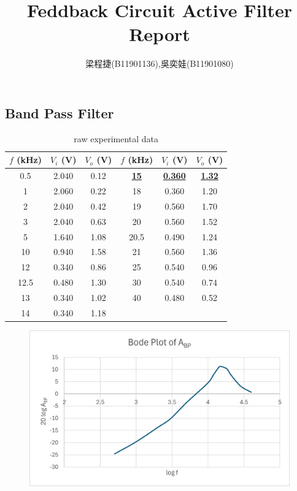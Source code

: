 \documentclass{article}
\title{Feddback Circuit Active Filter Report}
\author{梁程捷(B11901136),吳奕娃(B11901080)}
\date{}
\begin{document}
\begin{CJK*}{UTF8}{bkai}
\maketitle

\section*{Band Pass Filter}
\begin{minipage}{0.5\textwidth}
\begin{table}[H]
\begin{tabular}{|c|c|c||c|c|c|}
    \hline
    $f$ (\unit{\kilo\hertz}) &  $V_i$ (V)& $V_o$ (V) & $f$ (\unit{\kilo\hertz}) &  $V_i$ (V)& $V_o$ (V)\\
    \hline\hline
    0.5	    & 2.040 & 0.12 & \textbf{\underline{{15}}} & \textbf{\underline{{0.360}}} & \textbf{\underline{{1.32}}}   \\
    1       & 2.060 & 0.22 & 18     & 0.360 & 1.20  \\
    2	    & 2.040 & 0.42 & 19     & 0.560 & 1.70  \\
    3	    & 2.040 & 0.63 & 20     & 0.560 & 1.52   \\
    5	    & 1.640 & 1.08 & 20.5   & 0.490 & 1.24   \\
    10	    & 0.940 & 1.58 & 21     & 0.560 & 1.36   \\
    12	    & 0.340 & 0.86 & 25     & 0.540 & 0.96   \\
    12.5	& 0.480 & 1.30 & 30     & 0.540 & 0.74   \\
    13      & 0.340 & 1.02 & 40     & 0.480 & 0.52   \\
    14      & 0.340 & 1.18 &        &       &        \\
\hline
\end{tabular}
\caption{raw experimental data}
\end{table}
\end{minipage}\hspace{20mm}
\begin{minipage}{0.5\textwidth}
    \begin{figure}[H]    
        \includegraphics[scale=0.55]{Abp_bode_plot.png}

\end{figure}
\end{minipage}
\end{CJK*}
\end{document}
